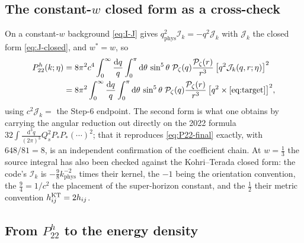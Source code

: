 \documentclass[11pt,a4paper]{article}
\newcommand{\cP}{\mathcal{P}}
\newcommand{\dd}{\mathrm{d}}
\newcommand{\wstar}{w^{*}}
\newcommand{\kphys}{k_{\mathrm{phys}}}
\newcommand{\qphys}{q_{\mathrm{phys}}}
\theoremstyle{remark}
\begin{document}
\subsection{The constant-\texorpdfstring{$w$}{w} closed form as a cross-check}

On a constant-$w$ background \eqref{eq:I-J} gives $\qphys^2\mathcal{I}_k = -q^2\mathcal{J}_k$ with $\mathcal{J}_k$ the closed form \eqref{eq:J-closed}, and $\wstar = w$, so
\begin{equation}
\begin{aligned}
P^h_{22}(k;\eta) &= 8\pi^2c^4\int_0^\infty\frac{\dd q}{q}\int_0^\pi\dd\theta\,\sin^5\theta\;\cP_\zeta(q)\frac{\cP_\zeta(r)}{r^3}\,\big[q^2\mathcal{J}_k(q,r;\eta)\big]^2\\
&= 8\pi^2\int_0^\infty\frac{\dd q}{q}\int_0^\pi\dd\theta\,\sin^5\theta\;\cP_\zeta(q)\frac{\cP_\zeta(r)}{r^3}\,\big[q^2\times\eqref{eq:target}\big]^2 ,
\end{aligned}
\label{eq:P22-analytic}
\end{equation}
using $c^2\mathcal{J}_k = $ the Step-6 endpoint. The second form is what one obtains by carrying the angular reduction out directly on the 2022 formula $32\int\frac{\dd^3q}{(2\pi)^3}Q_s^2P_*P_*(\cdots)^2$; that it reproduces \eqref{eq:P22-final} exactly, with $648/81 = 8$, is an independent confirmation of the coefficient chain. At $w=\tfrac13$ the source integral has also been checked against the Kohri--Terada closed form: the code's $\mathcal{I}_k$ is $-\tfrac98\kphys^{-2}$ times their kernel, the $-1$ being the orientation convention, the $\tfrac94 = 1/c^2$ the placement of the super-horizon constant, and the $\tfrac12$ their metric convention $h^{\rm KT}_{ij} = 2h_{ij}$.

\subsection{From \texorpdfstring{$P^h_{22}$}{P22} to the energy density}
\label{sec:omega}
\end{document}
